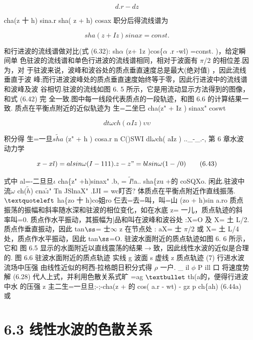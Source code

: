 \[d.r - dz\]

cha(z 十 h) sina.r sha( z + h) cosax 职分后得流线谱为

\begin{equation*}sha(z + Iz )sinax = const.\tag{6.42}\end{equation*}

和行进波的流线谱做对比(式 (6.32): sh$\alpha$ (z+ 1z )cos\{$\alpha$ .r -wl) =const. )，给定瞬间单 色驻波的流线谱和单色行进波的流线谱相同，相对于波面有 $\pi$/2 的相位差.因为，对 于驻波来说，波峰和波谷处的质点垂直速度总是最大(绝对值) ，因此流线垂直于波 峰;而行进波波峰处的质点垂直速度始终等于零，因此行进波中的流线谱和波峰及波 谷相切.驻波的流线如图 6. 5 所示，它是用流动显示方法得到的图像，和式 (6.42) 完 全一致.图中每一线段代表质点的一段轨迹，和图 6.6 的计算结果一致. 质点在平衡点附近的近似轨迹为 生=二坐巳 cha(z" + Iz ) sinax" coswt

\[dt \omega ch(\alpha Iz ) \upsilon \upsilon \]

积分得 生=一旦$\tilde{sha}$ (z" + h ) cosa.r n C()SWI dl$\omega$ch( aIz ) ..\_-\_.-, 第 6 章水波动力学

\begin{equation*}x-xl) =alsin\omega  (I - 111 ). z - z" = b l sin\omega  (1-/ 0 )\tag{6.43}\end{equation*}

式中 al=-二旦旦$\iota$ cha\{z" +h)sinax" .b, = $\tilde{I}$!a.. sha\{zu +的 coSQXo. 闲此.驻波中流$\omega$ ch($\tilde{h}$) cna$\tilde{z}$" Tn JSlnaX" .IJI = wc盯否? 体质点在平衡点附近作直线振荡. ${\rm ‘}$ ha\{zo 十 h)co姐ro 仨去=去=叫，叫=山 (zo + h)sin a.ro 质点振荡的振幅和斜率随水深和驻波的相位变化，如在水底 z= 一儿，质点轨迹的斜 率叫=0. 质点作水平振动，其振幅为|品和叫在波峰和波谷处 :X=O 及 X= 土 L/2. 质点作垂直振动，因此 tan${\rm ß}$= 士$\infty$ z 在节点处 : aX= 士 $\pi$/2 或 X= 土 L/4 处，质点作水平振动，因此 tan${\rm ß}$=O. 驻波水面附近的质点轨迹如图 6. 6 所示，它和 图 6.5 显示的水面附近以直线震荡的结果$\rightarrow$致，因此线性水波的近似是合理的. 图 6.6 驻波水面附近的质点轨迹 实线 g 波面 s 虚线 z 质点轨迹 (7) 行进水波流场中压强 由线性近似的柯西-拉格朗日积分式得 $\rho$ 一户. \_ il $\phi$ P ill 口 将速度势解 (6.28) 代人上式，并利用色散关系式旷 =ag ${\rm •}$ th(a的，便得行进波中水 的压强 z 主二生=一旦旦;-;-cha(z + 的 cos( a.r - wt) - gz p ch\{ah) (6.44a) 或

\section*{6.3  线性水波的色散关系}

